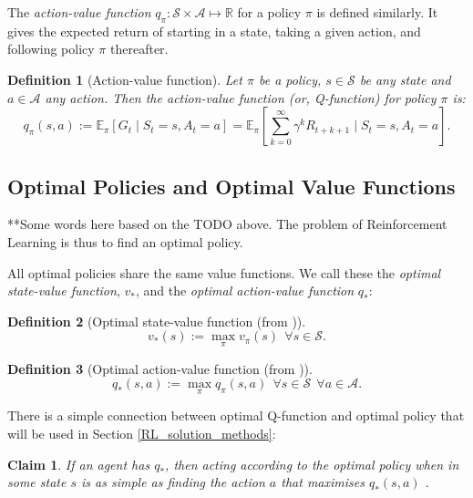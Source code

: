 \documentclass[11pt, a4paper, bibliography=totoc]{report}
\newcommand{\reals}{\mathbb{R}}
\newcommand{\E}[2]{\mathbb{E}_{#1} \left[ #2 \right] }
\newtheorem{claim}{Claim}
\newtheorem{definition}{Definition}
\begin{document}
The \textit{action-value function} $ q_\pi : \mathcal{S} \times \mathcal{A} \mapsto \reals $ for a policy $ \pi $ is defined similarly. It gives the expected return of starting in a state, taking a given action, and following policy $ \pi $ thereafter.
\begin{definition}[Action-value function]
	Let $ \pi $ be a policy, $ s \in \mathcal{S} $ be any state and $ a \in \mathcal{A} $ any action. Then the action-value function (or, Q-function) for policy $ \pi $ is:
	\begin{equation} \label{q_pi}
	q_\pi(s, a) := \E{\pi}{G_t \mid S_t = s, A_t = a} = \E{\pi}{\sum_{k=0}^{\infty} \gamma^k R_{t+k+1} \mid S_t = s, A_t = a}.
	\end{equation}
\end{definition}

\subsection{Optimal Policies and Optimal Value Functions} \label{optimal_policy_value_functions}
**Some words here based on the TODO above.
The problem of Reinforcement Learning is thus to find an optimal policy.

All optimal policies share the same value functions. We call these the \textit{optimal state-value function}, $ v_* $, and the \textit{optimal action-value function} $ q_* $:
\begin{definition}[Optimal state-value function (from {\cite[p.~62]{Sutton2018}})]
	$$ v_*(s)  := \max_\pi v_\pi(s) ~~ \forall s \in \mathcal{S} .$$
\end{definition}
\begin{definition}[Optimal action-value function (from {\cite[p.~63]{Sutton2018}})]
	$$ q_*(s,a)  := \max_\pi q_\pi(s,a) ~~ \forall s \in \mathcal{S} ~~ \forall a \in \mathcal{A} .$$
\end{definition}

There is a simple connection between optimal Q-function and optimal policy that will be used in Section \ref{RL_solution_methods}:
\begin{claim} \label{Q_claim}
	If an agent has $ q_* $, then acting according to the optimal policy when in some state $ s $ is as simple as finding the action $ a $ that maximises $ q_*(s,a) $ \cite[p.~64]{Sutton2018}.
\end{claim}
\end{document}
